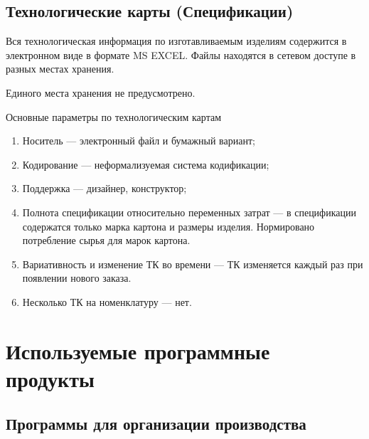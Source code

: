 \subsection{Технологические карты (Спецификации)}

Вся технологическая информация по изготавливаемым изделиям содержится в электронном виде в формате MS EXCEL.  Файлы находятся в сетевом доступе в разных местах хранения.

Единого места хранения не предусмотрено.


Основные параметры по технологическим картам
\begin{enumerate}
\item Носитель --- электронный файл и бумажный вариант;
\item Кодирование ---  неформализуемая система кодификации;
\item Поддержка --- дизайнер, конструктор;
\item Полнота спецификации относительно переменных затрат --- в спецификации содержатся только марка картона и размеры изделия. Нормировано потребление сырья для марок картона.
\item Вариативность и изменение ТК во времени --- ТК изменяется каждый раз при появлении нового заказа.
\item Несколько ТК на номенклатуру --- нет.
\end{enumerate}



\section{Используемые программные продукты}

\subsection{Программы для организации производства}

